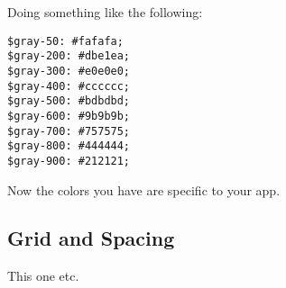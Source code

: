 Doing something like the following:
\begin{lstlisting}
$gray-50: #fafafa;
$gray-200: #dbe1ea;
$gray-300: #e0e0e0;
$gray-400: #cccccc;
$gray-500: #bdbdbd;
$gray-600: #9b9b9b;
$gray-700: #757575;
$gray-800: #444444;
$gray-900: #212121;
\end{lstlisting}

Now the colors you have are specific to your app.

\subsection{ Grid and Spacing }
This one etc.
